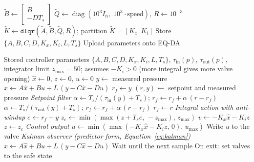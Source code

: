 \documentclass[12pt,a4paper]{article}
\begin{document}
\begin{algorithm}[ht]
\begin{algorithmic}[1]
         \quad $\tilde{B} \gets \begin{bmatrix} B \\ -D T_s \end{bmatrix}$
  \State $\tilde{Q} \gets \operatorname{diag}(10^{3} I_n,\; 10^{3}\cdot\text{speed})$, \quad $R \gets 10^{-3}$
  \State $\tilde{K} \gets \texttt{dlqr}(\tilde{A}, \tilde{B}, \tilde{Q}, R)$;
         \quad partition $\tilde{K} = [K_x \;\, K_i]$
  \State Store $\{A, B, C, D, K_x, K_i, L, T_s\}$
  \State Upload parameters onto EQ-DA
\EndProcedure
\end{algorithmic}
\end{algorithm}

\begin{algorithm}[ht]
\caption{Real-time LQI control on the EQ-DA (every $T_s$)}\label{alg:online}
\begin{algorithmic}[1]
\Require Stored controller parameters $\{A, B, C, D, K_x, K_i, L, T_s\}$, $\tau_{\text{in}}(p)$, $\tau_{\text{out}}(p)$,
         integrator limit $z_{\max} = 50$; assumes $-K_i > 0$ (more integral gives more valve opening)
  \State $\hat{x} \gets 0$, \quad $z \gets 0$, \quad $u \gets 0$
   
    \State $y \gets$ measured pressure
    \State $\hat{x} \gets A\hat{x} + Bu + L\,(y - C\hat{x} - Du)$
  \EndFor
  \State $r_f \gets y$ 
  \Loop
    \State $(r, y) \gets$ setpoint and measured pressure
    \Statex \hspace{\algorithmicindent}\textit{Setpoint filter}
     
      \State $\alpha \gets T_s / (\tau_{\text{in}}(y) + T_s)$; \quad
             $r_f \gets r_f + \alpha\,(r - r_f)$
     
      \State $\alpha \gets T_s / (\tau_{\text{out}}(y) + T_s)$; \quad
             $r_f \gets r_f + \alpha\,(r - r_f)$
    \Else
      \State $r_f \gets r$
    \EndIf
    \Statex \hspace{\algorithmicindent}\textit{Integral action with anti-windup}
    \State $e \gets r_f - y$
    \State $z_c \gets \min(\max(z + T_s e,\, -z_{\max}),\, z_{\max})$
    \State $v \gets -K_x\hat{x} - K_i z$
      \State $z \gets z_c$ 
    \EndIf
    \Statex \hspace{\algorithmicindent}\textit{Control output}
    \State $u \gets \min(\max(-K_x\hat{x} - K_i z,\, 0),\, u_{\max})$
    \State Write $u$ to the valve
    \Statex \hspace{\algorithmicindent}\textit{Kalman observer (predictor form, Equation~\eqref{eq:kalman})}
    \State $\hat{x} \gets A\hat{x} + Bu + L\,(y - C\hat{x} - Du)$ 
    \State Wait until the next sample
  \EndLoop
  \State On exit: set valves to the safe state
\EndProcedure
\end{algorithmic}
\end{algorithm}
\end{document}
